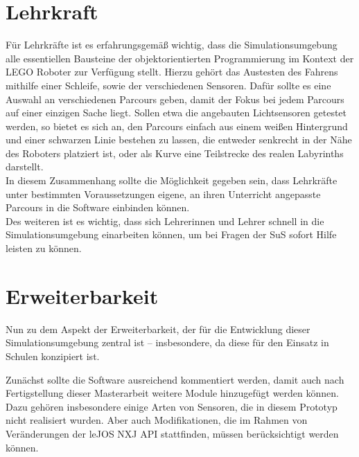 \documentclass[paper=a4, DIV=calc, BCOR=12mm, twoside=on, onecolumn=on, open = right, titlepage =on, parskip =half-, headsepline = on, footsepline = off, chapterprefix = off, appendixprefix = on, fontsize = 12pt, numbers = noenddot, abstract = on]{scrbook}
\begin{document}
\vspace*{-2ex}
\par \singlespacing
\section{Lehrkraft}
\label{sec:lehrkraft}
\vspace*{-1ex}
\par \onehalfspacing
Für Lehrkräfte ist es erfahrungsgemäß wichtig, dass die Simulationsumgebung alle essentiellen Bausteine der objektorientierten Programmierung im Kontext der \textsc{LEGO} Roboter zur Verfügung stellt. Hierzu gehört das Austesten des Fahrens mithilfe einer Schleife, sowie der verschiedenen Sensoren. Dafür sollte es eine Auswahl an verschiedenen Parcours geben, damit der Fokus bei jedem Parcours auf einer einzigen Sache liegt. Sollen etwa die angebauten Lichtsensoren getestet werden, so bietet es sich an, den Parcours einfach aus einem weißen Hintergrund und einer schwarzen Linie bestehen zu lassen, die entweder senkrecht in der Nähe des Roboters platziert ist, oder als Kurve eine Teilstrecke des realen Labyrinths darstellt.\\
In diesem Zusammenhang sollte die Möglichkeit gegeben sein, dass Lehrkräfte unter bestimmten Voraussetzungen eigene, an ihren Unterricht angepasste Parcours in die Software einbinden können.\\
Des weiteren ist es wichtig, dass sich Lehrerinnen und Lehrer schnell in die Simulationsumgebung einarbeiten können, um bei Fragen der SuS sofort Hilfe leisten zu können. %



\par \singlespacing
\section{Erweiterbarkeit} \label{sec:erweiterbarkeit}
\onehalfspacing
Nun zu dem Aspekt der Erweiterbarkeit, der für die Entwicklung dieser Simulationsumgebung zentral ist -- insbesondere, da diese für den Einsatz in Schulen konzipiert ist.

Zunächst sollte die Software ausreichend kommentiert werden, damit auch nach Fertigstellung dieser Masterarbeit weitere Module hinzugefügt werden können. Dazu gehören insbesondere einige Arten von Sensoren, die in diesem Prototyp nicht realisiert wurden. Aber auch Modifikationen, die im Rahmen von Veränderungen der leJOS NXJ API stattfinden, müssen berücksichtigt werden können.
\end{document}
